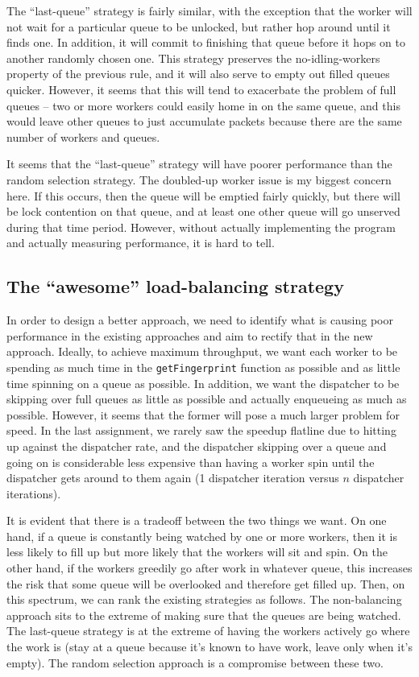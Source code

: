 \documentclass{article}
\begin{document}
The ``last-queue'' strategy is fairly similar, with the exception that the worker will not wait for a particular queue to be unlocked, but rather hop around until it finds one. In addition, it will commit to finishing that queue before it hops on to another randomly chosen one. This strategy preserves the no-idling-workers property of the previous rule, and it will also serve to empty out filled queues quicker. However, it seems that this will tend to exacerbate the problem of full queues -- two or more workers could easily home in on the same queue, and this would leave other queues to just accumulate packets because there are the same number of workers and queues.

It seems that the ``last-queue'' strategy will have poorer performance than the random selection strategy. The doubled-up worker issue is my biggest concern here. If this occurs, then the queue will be emptied fairly quickly, but there will be lock contention on that queue, and at least one other queue will go unserved during that time period. However, without actually implementing the program and actually measuring performance, it is hard to tell.
\subsection*{The ``awesome'' load-balancing strategy}
In order to design a better approach, we need to identify what is causing poor performance in the existing approaches and aim to rectify that in the new approach. Ideally, to achieve maximum throughput, we want each worker to be spending as much time in the \verb|getFingerprint| function as possible and as little time spinning on a queue as possible. In addition, we want the dispatcher to be skipping over full queues as little as possible and actually enqueueing as much as possible. However, it seems that the former will pose a much larger problem for speed. In the last assignment, we rarely saw the speedup flatline due to hitting up against the dispatcher rate, and the dispatcher skipping over a queue and going on is considerable less expensive than having a worker spin until the dispatcher gets around to them again (1 dispatcher iteration versus $n$ dispatcher iterations).

It is evident that there is a tradeoff between the two things we want. On one hand, if a queue is constantly being watched by one or more workers, then it is less likely to fill up but more likely that the workers will sit and spin. On the other hand, if the workers greedily go after work in whatever queue, this increases the risk that some queue will be overlooked and therefore get filled up. Then, on this spectrum, we can rank the existing strategies as follows. The non-balancing approach sits to the extreme of making sure that the queues are being watched. The last-queue strategy is at the extreme of having the workers actively go where the work is (stay at a queue because it's known to have work, leave only when it's empty). The random selection approach is a compromise between these two.
\end{document}
